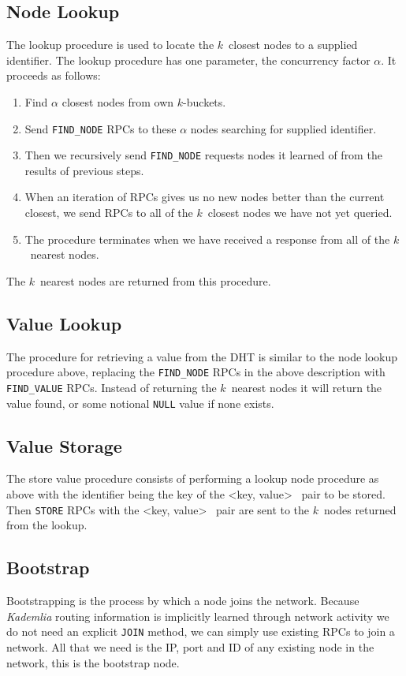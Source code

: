 \documentclass[12pt,notitlepage,a4paper]{report}
\newcommand{\kademlia}{\emph{Kademlia}}
\newcommand{\K}{$k$}
\begin{document}
	\subsection{Node Lookup}
	The lookup procedure is used to locate the \K~closest nodes to a supplied identifier. The lookup procedure has one parameter, the concurrency factor $\alpha$. It proceeds as follows:
	\begin{enumerate}
		\item Find $\alpha$ closest nodes from own \K-buckets.
		\item Send \texttt{FIND\_NODE} RPCs to these $\alpha$ nodes searching for supplied identifier.
		\item Then we recursively send \texttt{FIND\_NODE} requests nodes it learned of from the results of previous steps.
		\item When an iteration of RPCs gives us no new nodes better than the current closest, we send RPCs to all of the \K~closest nodes we have not yet queried.
		\item The procedure terminates when we have received a response from all of the \K~nearest nodes.
	\end{enumerate}
	The \K~nearest nodes are returned from this procedure.
	
	\subsection{Value Lookup}
	The procedure for retrieving a value from the DHT is similar to the node lookup procedure above, replacing the \texttt{FIND\_NODE} RPCs in the above description with \texttt{FIND\_VALUE} RPCs. Instead of returning the \K~nearest nodes it will return the value found, or some notional \texttt{NULL} value if none exists.
	
	\subsection{Value Storage}
	The store value procedure consists of performing a lookup node procedure as above with the identifier being the key of the \textless key, value\textgreater~ pair to be stored. Then \texttt{STORE} RPCs with the \textless key, value\textgreater~ pair are sent to the \K~nodes returned from the lookup.
	
	\subsection{Bootstrap}
	Bootstrapping is the process by which a node joins the network. Because \kademlia{} routing information is implicitly learned through network activity we do not need an explicit \texttt{JOIN} method, we can simply use existing RPCs to join a network. All that we need is the IP, port and ID of any existing node in the network, this is the bootstrap node.
	
\end{document}
